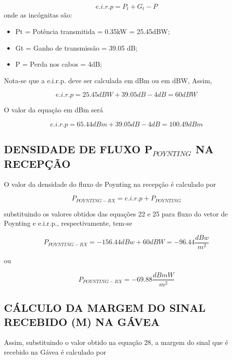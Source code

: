 \documentclass[a4paper,12pt]{article}
\begin{document}
\begin{equation}
 e.i.r.p = P_t + G_t - P
\end{equation}
onde as incógnitas são:
\begin{itemize}
  \item  Pt = Potência transmitida = 0.35kW = 25.45dBW;
  \item Gt = Ganho de transmissão = 39.05 dB;
  \item P = Perda nos cabos = 4dB;
\end{itemize}

Nota-se que a e.i.r.p. deve ser calculada em dBm ou em dBW, Assim, 

\begin{equation}
e.i.r.p = 25.45dBW + 39.05dB - 4dB = 60dBW
\end{equation}

O valor da equação em dBm será

\begin{equation}
 e.i.r.p = 65.44dBm + 39.05dB - 4dB = 100.49dBm
\end{equation}

\subsection{DENSIDADE DE FLUXO P$_{POYNTING}$ NA RECEPÇÃO}
O valor da densidade do fluxo de Poynting na recepção é calculado por

\begin{equation}
  P_{POYNTING-RX} = e.i.r.p +  P_{POYNTING}
\end{equation}

substituindo os valores obtidos das equações 22 e 25 para fluxo do vetor de
Poynting e e.i.r.p., respectivamente, tem-se

\begin{equation}
 P_{POYNTING-RX} = -156.44dBw +  60dBW = -96.44\dfrac{dBw}{m^2}
 \end{equation}
 
 ou 
 
 \begin{equation}
  P_{POYNTING-RX} = -69.88 \dfrac{dBmW}{m^2}
 \end{equation}

 \subsection{CÁLCULO DA MARGEM DO SINAL RECEBIDO (M) NA GÁVEA}
 Assim, substituindo o valor obtido na equação 28, a margem do sinal que é
recebido na Gávea é calculado por
\end{document}
